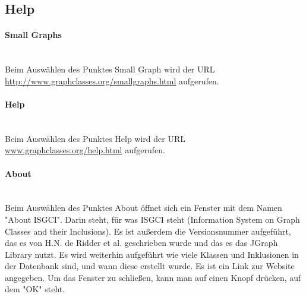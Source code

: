 \documentclass[10pt,a4paper]{article}
\begin{document}
\subsection{Help}
\paragraph{Small Graphs}\ \\
Beim Auswählen des Punktes Small Graph wird der URL \href{http://www.graphclasses.org/smallgraphs.html}{http://www.graphclasses.org/smallgraphs.html} aufgerufen.\\
\paragraph{Help}\ \\
Beim Auswählen des Punktes Help wird der URL \href{www.graphclasses.org/help.html}{www.graphclasses.org/help.html} aufgerufen.\\
\paragraph{About}\ \\
Beim Auswählen des Punktes About öffnet sich ein Fenster mit dem Namen "About ISGCI". Darin steht, für was ISGCI steht (Information System on Graph Classes and their Inclusions). Es ist außerdem die Versionsnummer aufgeführt, das es von H.N. de Ridder et al. geschrieben wurde und das es das JGraph Library nutzt. Es wird weiterhin aufgeführt wie viele Klassen und Inklusionen in der Datenbank sind, und wann diese erstellt wurde. Es ist ein Link zur Website angegeben. Um das Fenster zu schließen, kann man auf einen Knopf drücken, auf dem "OK" steht.\\
\end{document}
